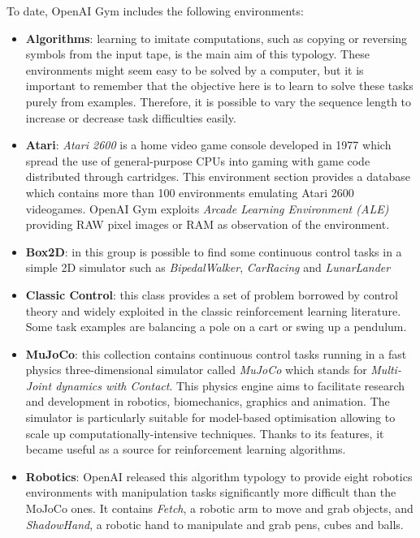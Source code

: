 To date, OpenAI Gym includes the following environments:
\begin{itemize}
	\item \textbf{Algorithms}: learning to imitate computations, such as copying or reversing symbols from the input tape, is the main aim of this typology.
These environments might seem easy to be solved by a computer, but it is important to remember that the objective here is to learn to solve these tasks purely from examples.
Therefore, it is possible to vary the sequence length to increase or decrease task difficulties easily.
	\item \textbf{Atari}: \textit{Atari 2600} is a home video game console developed in 1977 which spread the use of general-purpose CPUs into gaming with game code distributed through cartridges.
This environment section provides a database which contains more than 100 environments emulating Atari 2600 videogames.
OpenAI Gym exploits \textit{Arcade Learning Environment (ALE)} \cite{bellemare2013arcade} providing RAW pixel images or RAM as observation of the environment.
	\item \textbf{Box2D}: in this group is possible to find some continuous control tasks in a simple 2D simulator such as \textit{BipedalWalker}, \textit{CarRacing} and \textit{LunarLander}
	\item \textbf{Classic Control}: this class provides a set of problem borrowed by control theory and widely exploited in the classic reinforcement learning literature.
Some task examples are balancing a pole on a cart or swing up a pendulum.
	\item \textbf{MuJoCo}: this collection contains continuous control tasks running in a fast physics three-dimensional simulator called \textit{MuJoCo} which stands for \textit{Multi-Joint dynamics with Contact}.
This physics engine aims to facilitate research and development in robotics, biomechanics, graphics and animation.
The simulator is particularly suitable for model-based optimisation allowing to scale up computationally-intensive techniques.
	      Thanks to its features, it became useful as a source for reinforcement learning algorithms.
\cite{todorov2012mujoco}
	\item \textbf{Robotics}: OpenAI released this algorithm typology to provide eight robotics environments with manipulation tasks significantly more difficult than the MoJoCo ones.
It contains \textit{Fetch}, a robotic arm to move and grab objects, and \textit{ShadowHand}, a robotic hand to manipulate and grab pens, cubes and balls.
\cite{ingredientsRoboticsResearch}
\end{itemize}

